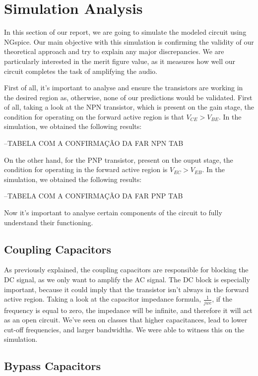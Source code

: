 \section{Simulation Analysis}
\label{simulanal}


In this section of our report, we are going to simulate the modeled circuit using NGspice. Our main objective with this simulation is confirming the validity of our theoretical approach and try to explain any major discrepancies. We are particularly interested in the merit figure value, as it measures how well our circuit completes the task of amplifying the audio. 

First of all, it's important to analyse and ensure the transistors are working in the desired region as, otherwise, none of our predictions would be validated.
First of all, taking a look at the NPN transistor, which is present on the gain stage, the condition for operating on the forward active region is that $V_{CE}>V_{BE}$. In the simulation, we obtained the following results:

--TABELA COM A CONFIRMAÇÃO DA FAR NPN TAB

On the other hand, for the PNP transistor, present on the ouput stage, the condition for operating in the forward active region is $V_{EC}>V_{EB}$. In the simulation, we obtained the following results:


--TABELA COM A CONFIRMAÇÃO DA FAR PNP TAB

Now it's important to analyse certain components of the circuit to fully understand their functioning.

\subsection{Coupling Capacitors}

\par 


As previously explained, the coupling capacitors are responsible for blocking the DC signal, as we only want to amplify the AC signal. The DC block is especially important, because it could imply that the transistor isn't always in the forward active region. Taking a look at the capacitor impedance formula, $\frac{1}{jwc}$, if the frequency is equal to zero, the impedance will be infinite, and therefore it will act as an open circuit. We've seen on classes that higher capacitances, lead to lower cut-off frequencies, and larger bandwidths. We were able to witness this on the simulation. 


\subsection{Bypass Capacitors}

